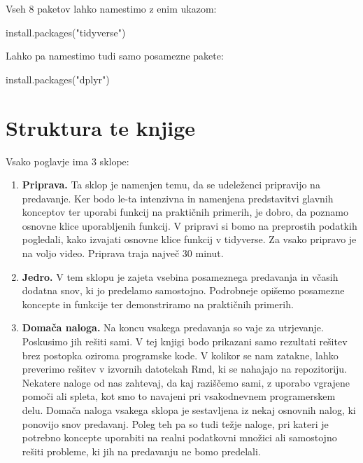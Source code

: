 \documentclass[
]{book}
\newenvironment{Shaded}{\begin{snugshade}}{\end{snugshade}}
\newcommand{\FunctionTok}[1]{\textcolor[rgb]{0.00,0.00,0.00}{#1}}
\newcommand{\NormalTok}[1]{#1}
\newcommand{\StringTok}[1]{\textcolor[rgb]{0.31,0.60,0.02}{#1}}
\begin{document}
Vseh 8 paketov lahko namestimo z enim ukazom:

\begin{Shaded}
\begin{Highlighting}[]
\FunctionTok{install.packages}\NormalTok{(}\StringTok{"tidyverse"}\NormalTok{)}
\end{Highlighting}
\end{Shaded}

Lahko pa namestimo tudi samo posamezne pakete:

\begin{Shaded}
\begin{Highlighting}[]
\FunctionTok{install.packages}\NormalTok{(}\StringTok{"dplyr"}\NormalTok{)}
\end{Highlighting}
\end{Shaded}

\hypertarget{struktura-te-knjige}{%
\section*{Struktura te knjige}\label{struktura-te-knjige}}

Vsako poglavje ima 3 sklope:

\begin{enumerate}
\def\labelenumi{\arabic{enumi})}
\item
  \textbf{Priprava.} Ta sklop je namenjen temu, da se udeleženci pripravijo na predavanje. Ker bodo le-ta intenzivna in namenjena predstavitvi glavnih konceptov ter uporabi funkcij na praktičnih primerih, je dobro, da poznamo osnovne klice uporabljenih funkcij. V pripravi si bomo na preprostih podatkih pogledali, kako izvajati osnovne klice funkcij v tidyverse. Za vsako pripravo je na voljo video. Priprava traja največ 30 minut.
\item
  \textbf{Jedro.} V tem sklopu je zajeta vsebina posameznega predavanja in včasih dodatna snov, ki jo predelamo samostojno. Podrobneje opišemo posamezne koncepte in funkcije ter demonstriramo na praktičnih primerih.
\item
  \textbf{Domača naloga.} Na koncu vsakega predavanja so vaje za utrjevanje. Poskusimo jih rešiti sami. V tej knjigi bodo prikazani samo rezultati rešitev brez postopka oziroma programske kode. V kolikor se nam zatakne, lahko preverimo rešitev v izvornih datotekah Rmd, ki se nahajajo na repozitoriju. Nekatere naloge od nas zahtevaj, da kaj raziščemo sami, z uporabo vgrajene pomoči ali spleta, kot smo to navajeni pri vsakodnevnem programerskem delu. Domača naloga vsakega sklopa je sestavljena iz nekaj osnovnih nalog, ki ponovijo snov predavanj. Poleg teh pa so tudi težje naloge, pri kateri je potrebno koncepte uporabiti na realni podatkovni množici ali samostojno rešiti probleme, ki jih na predavanju ne bomo predelali.
\end{enumerate}
\end{document}
